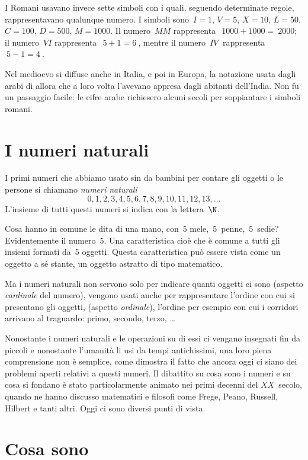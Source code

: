 I Romani usavano invece sette simboli con i quali, seguendo determinate 
regole, rappresentavano qualunque numero. 
I simboli sono~\(I=1\), \(V=5\), \(X=10\), \(L=50\), \(C=100\), \(D=500\), 
\(M=1000\).
Il numero~\(MM\) rappresenta~\(~1000+1000 =~2000\); il numero~\( VI\) 
rappresenta~\(~5+1=6~\), mentre il numero~\( IV~\) rappresenta~\(~5-1=4~\).

Nel medioevo si diffuse anche in Italia, e poi in Europa, la notazione usata
dagli arabi di allora che a loro volta l'avevano appresa dagli abitanti 
dell'India. 
Non fu un passaggio facile: le cifre arabe richiesero alcuni secoli per 
soppiantare i simboli romani.

\section{I numeri naturali}
\label{sec:nat_naturali}

I primi numeri che abbiamo usato sin da bambini per contare gli oggetti o 
le persone si chiamano \emph{numeri naturali}
\[ 0, 1, 2, 3, 4, 5, 6, 7, 8, 9, 10, 11, 12, 13, \dots \]
L'insieme di tutti questi numeri si indica con la lettera~\(\N\).

Cosa hanno in comune le dita di una mano, con~5 mele,~5~penne,~5~sedie? 
Evidentemente il numero~5. Una caratteristica cioè che è comune a tutti gli 
insiemi formati da~5 oggetti. 
Questa caratteristica può essere vista come un oggetto a sé stante, 
un oggetto astratto di tipo matematico.

Ma i numeri naturali non servono solo per indicare quanti oggetti ci sono 
(aspetto \emph{cardinale} del numero), vengono usati anche per 
rappresentare 
l'ordine con cui si presentano gli oggetti, (aspetto \emph{ordinale}), 
l'ordine per esempio con cui i corridori arrivano al traguardo: primo, 
secondo, terzo, \ldots

Nonostante i numeri naturali e le operazioni su di essi ci vengano 
insegnati fin da piccoli e nonostante l'umanità li usi da tempi 
antichissimi, una loro piena comprensione non è semplice, come dimostra il 
fatto che ancora oggi ci siano dei problemi aperti relativi a questi numeri. 
Il dibattito su cosa sono i numeri e su cosa si fondano è stato 
particolarmente animato nei primi decenni del \(XX\)~secolo, quando ne hanno 
discusso matematici e filosofi come Frege, Peano, Russell, Hilbert e tanti 
altri. Oggi ci sono diversi punti di vista.

\section{Cosa sono}
\label{sec:nat_definizione}

